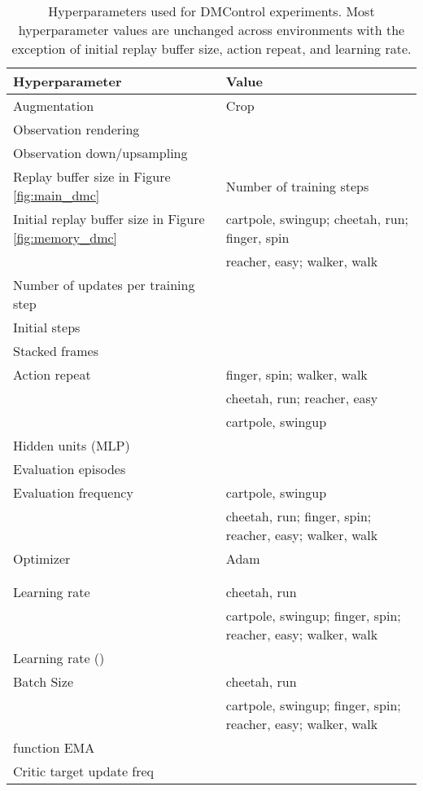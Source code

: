 \documentclass{article}
\begin{document}
\begin{table*}[ht]
\caption{Hyperparameters used for DMControl experiments. Most hyperparameter values are unchanged across environments with the exception of initial replay buffer size, action repeat, and learning rate.}
\vskip 0.15in
\begin{center}
\begin{small}
\begin{tabular}{ll}
\toprule
\textbf{Hyperparameter} & \textbf{Value}  \\
\midrule
Augmentation    & Crop  \\ 
Observation rendering    &   \\ 
Observation down/upsampling    &  \\ 
Replay buffer size in Figure \ref{fig:main_dmc}   & Number of training steps \\ 
Initial replay buffer size in Figure \ref{fig:memory_dmc}  &  cartpole, swingup; cheetah, run; finger, spin \\
 &  reacher, easy; walker, walk \\
Number of updates per training step  &  \\
Initial steps    &   \\ 
Stacked frames    &   \\ 
Action repeat    &  finger, spin; walker, walk\\
 &  cheetah, run; reacher, easy  \\
 &  cartpole, swingup \\
Hidden units (MLP)    &   \\ 
Evaluation episodes    &   \\ 
Evaluation frequency    &  cartpole, swingup \\ 
 &  cheetah, run; finger, spin; reacher, easy; walker, walk \\
Optimizer    & Adam  \\ 
   &   \\
   &   \\
Learning rate  &  cheetah, run \\ 
&  cartpole, swingup; finger, spin; reacher, easy; walker, walk \\
Learning rate () &  \\
Batch Size    &  cheetah, run \\
&  cartpole, swingup; finger, spin; reacher, easy; walker, walk \\
 function EMA  &  \\
Critic target update freq &  \\

\end{tabular}
\end{small}
\end{center}
\end{table*}
\end{document}
